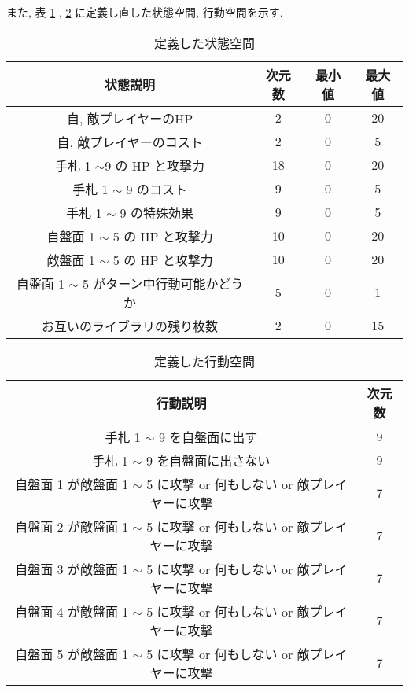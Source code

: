 \documentclass{jarticle}     %
\begin{document}
また, 表 \ref{table:state} , \ref{table:action} に定義し直した状態空間, 行動空間を示す.

\begin{table}[h]
  \centering
  \caption{定義した状態空間}
  \label{table:state}
  \begin{tabular}{|c|c|c|c|}
  \hline
  状態説明                        & 次元数        & 最小値        & 最大値         \\ \hline
  自, 敵プレイヤーのHP  & 2 & 0 & 20 \\
  \hline
  自, 敵プレイヤーのコスト & 2 & 0 & 5 \\ \hline

  手札 1 $\sim$9 の HP と攻撃力      & 18         & 0          & 20          \\ \hline
  手札 1 $\sim$ 9 のコスト & 9 & 0 & 5 \\ \hline
  手札 1 $\sim$ 9 の特殊効果 &  9 & 0 & 5 \\ \hline
  自盤面 1 $\sim$ 5 の HP と攻撃力     & 10         & 0          & 20          \\ \hline
  敵盤面 1 $\sim$ 5 の HP と攻撃力     & 10         & 0          & 20          \\ \hline
  自盤面 1 $\sim$ 5 がターン中行動可能かどうか & 5          & 0          & 1           \\ \hline
  お互いのライブラリの残り枚数     & 2 & 0 & 15 \\ \hline
  \end{tabular}
  \end{table}

  \begin{table}[h]
    \centering
    \caption{定義した行動空間}
    \label{table:action}
    \begin{tabular}{|c|c|}
    \hline
    行動説明                          & 次元数        \\ \hline
    手札 1 $\sim$ 9 を自盤面に出す             & 9          \\ \hline
    手札 1 $\sim$ 9 を自盤面に出さない & 9 \\ \hline
    自盤面 1 が敵盤面 1 $\sim$ 5 に攻撃 or 何もしない or 敵プレイヤーに攻撃    & 7          \\ \hline
    自盤面 2 が敵盤面 1 $\sim$ 5 に攻撃 or 何もしない or 敵プレイヤーに攻撃    & 7   \\ \hline
    自盤面 3 が敵盤面 1 $\sim$ 5 に攻撃 or 何もしない or 敵プレイヤーに攻撃    & 7\\ \hline
    自盤面 4 が敵盤面 1 $\sim$ 5 に攻撃 or 何もしない or 敵プレイヤーに攻撃    & 7 \\ \hline
    自盤面 5 が敵盤面 1 $\sim$ 5 に攻撃 or 何もしない or 敵プレイヤーに攻撃    & 7\\ \hline
    \end{tabular}
    \end{table}
  
\end{document}
